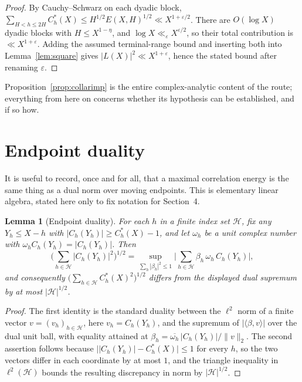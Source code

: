 \documentclass[11pt]{article}
\newtheorem{lemma}[theorem]{Lemma}
\begin{document}
\begin{proof}
By Cauchy--Schwarz on each dyadic block,
$\sum_{H<h\le 2H}C_h^\ast(X)\le H^{1/2}E(X,H)^{1/2}\ll X^{1+\varepsilon/2}$.
There are $O(\log X)$ dyadic blocks with $H\le X^{1-\eta}$, and $\log X\ll_\varepsilon X^{\varepsilon/2}$,
so their total contribution is $\ll X^{1+\varepsilon}$. Adding the assumed terminal-range bound and
inserting both into Lemma~\ref{lem:square} gives $|L(X)|^2\ll X^{1+\varepsilon}$, hence the stated bound
after renaming $\varepsilon$.
\end{proof}

Proposition~\ref{prop:collarimp} is the entire complex-analytic content of the route; everything from here
on concerns whether its hypothesis can be established, and if so how.

\section{Endpoint duality}

It is useful to record, once and for all, that a maximal correlation energy is the same thing as a dual
norm over moving endpoints. This is elementary linear algebra, stated here only to fix notation for
Section~4.

\begin{lemma}[Endpoint duality]
\label{lem:duality}
For each $h$ in a finite index set $\mathcal H$, fix any $Y_h\le X-h$ with $|C_h(Y_h)|\ge C_h^\ast(X)-1$,
and let $\omega_h$ be a unit complex number with $\omega_hC_h(Y_h)=|C_h(Y_h)|$. Then
\[
\Big(\sum_{h\in\mathcal H}|C_h(Y_h)|^2\Big)^{1/2}
=\sup_{\sum_h|\beta_h|^2\le1}\Big|\sum_{h\in\mathcal H}\beta_h\,\omega_h\,C_h(Y_h)\Big|,
\]
and consequently $\big(\sum_{h\in\mathcal H}C_h^\ast(X)^2\big)^{1/2}$ differs from the displayed dual
supremum by at most $|\mathcal H|^{1/2}$.
\end{lemma}

\begin{proof}
The first identity is the standard duality between the $\ell^2$ norm of a finite vector
$v=(v_h)_{h\in\mathcal H}$, here $v_h=C_h(Y_h)$, and the supremum of $|\langle\beta,v\rangle|$ over the
dual unit ball, with equality attained at $\beta_h=\overline{\omega_h}\,|C_h(Y_h)|\big/\|v\|_2$. The second
assertion follows because $\big||C_h(Y_h)|-C_h^\ast(X)\big|\le1$ for every $h$, so the two vectors differ
in each coordinate by at most $1$, and the triangle inequality in $\ell^2(\mathcal H)$ bounds the resulting
discrepancy in norm by $|\mathcal H|^{1/2}$.
\end{proof}
\end{document}
